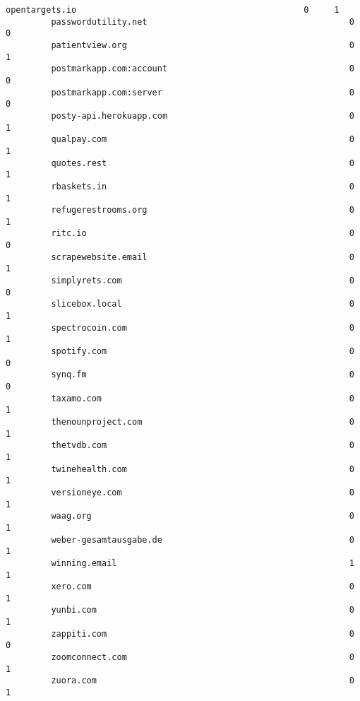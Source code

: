 \documentclass[11pt]{article}
\begin{document}
\begin{Verbatim}[commandchars=\\\{\}]
         opentargets.io                                             0     1   
         passwordutility.net                                        0     0   
         patientview.org                                            0     1   
         postmarkapp.com:account                                    0     0   
         postmarkapp.com:server                                     0     0   
         posty-api.herokuapp.com                                    0     1   
         qualpay.com                                                0     1   
         quotes.rest                                                0     1   
         rbaskets.in                                                0     1   
         refugerestrooms.org                                        0     1   
         ritc.io                                                    0     0   
         scrapewebsite.email                                        0     1   
         simplyrets.com                                             0     0   
         slicebox.local                                             0     1   
         spectrocoin.com                                            0     1   
         spotify.com                                                0     0   
         synq.fm                                                    0     0   
         taxamo.com                                                 0     1   
         thenounproject.com                                         0     1   
         thetvdb.com                                                0     1   
         twinehealth.com                                            0     1   
         versioneye.com                                             0     1   
         waag.org                                                   0     1   
         weber-gesamtausgabe.de                                     0     1   
         winning.email                                              1     1   
         xero.com                                                   0     1   
         yunbi.com                                                  0     1   
         zappiti.com                                                0     0   
         zoomconnect.com                                            0     1   
         zuora.com                                                  0     1   
         

\end{Verbatim}
\end{document}
